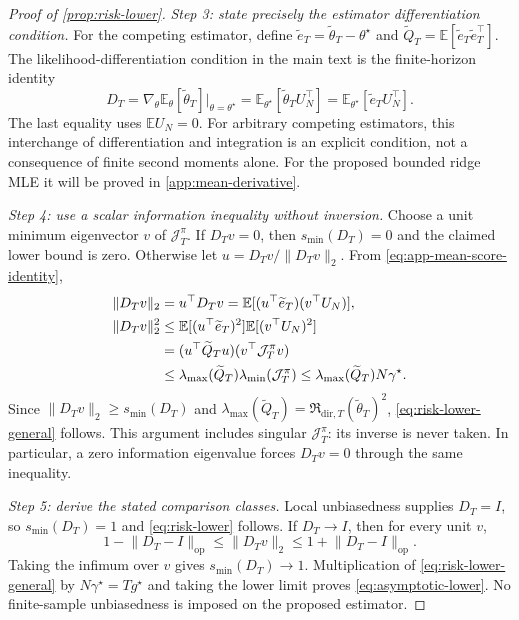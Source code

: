 \documentclass[10pt,twoside,letterpaper]{article}
\newcommand{\E}{\mathbb E}
\newcommand{\op}{\mathrm{op}}
\newcommand{\norm}[1]{\lVert #1\rVert}
\newcommand{\gstar}{g^\star}
\begin{document}
\begin{proof}[Proof of \cref{prop:risk-lower}]
\textit{Step 3: state precisely the estimator differentiation condition.}
For the competing estimator, define
$\widetilde e_T=\widetilde\theta_T-\theta^\star$ and
$\widetilde Q_T=\E[\widetilde e_T\widetilde e_T^\top]$.
The likelihood-differentiation condition in the main text is the
finite-horizon identity
\begin{equation}
D_T=\nabla_\theta\E_\theta[\widetilde\theta_T]\big|_{\theta=\theta^\star}
=\E_{\theta^\star}[\widetilde\theta_TU_N^\top]
=\E_{\theta^\star}[\widetilde e_TU_N^\top].
\label{eq:app-mean-score-identity}
\end{equation}
The last equality uses $\E U_N=0$. For arbitrary competing estimators,
this interchange of differentiation and integration is an explicit
condition, not a consequence of finite second moments alone.
For the proposed bounded ridge MLE it will be proved in
\cref{app:mean-derivative}.

\textit{Step 4: use a scalar information inequality without inversion.}
Choose a unit minimum eigenvector $v$ of $\mathcal J_T^\pi$.
If $D_Tv=0$, then $s_{\min}(D_T)=0$ and the claimed lower bound is
zero. Otherwise let $u=D_Tv/\norm{D_Tv}_2$. From
\eqref{eq:app-mean-score-identity},
\begin{align}
\norm{D_Tv}_2
&=u^\top D_Tv
=\E[(u^\top\widetilde e_T)(v^\top U_N)],\notag\\
\norm{D_Tv}_2^2
&\le\E[(u^\top\widetilde e_T)^2]\E[(v^\top U_N)^2]\notag\\
&=(u^\top\widetilde Q_Tu)(v^\top\mathcal J_T^\pi v)\notag\\
&\le\lambda_{\max}(\widetilde Q_T)
\lambda_{\min}(\mathcal J_T^\pi)
\le\lambda_{\max}(\widetilde Q_T)N\gamma^\star.
\label{eq:app-cr-direction}
\end{align}
Since $\norm{D_Tv}_2\ge s_{\min}(D_T)$ and
$\lambda_{\max}(\widetilde Q_T)
=\mathfrak R_{\mathrm{dir},T}(\widetilde\theta_T)^2$,
\eqref{eq:risk-lower-general} follows. This argument includes singular
$\mathcal J_T^\pi$: its inverse is never taken. In particular, a zero
information eigenvalue forces $D_Tv=0$ through the same inequality.

\textit{Step 5: derive the stated comparison classes.}
Local unbiasedness supplies $D_T=I$, so $s_{\min}(D_T)=1$ and
\eqref{eq:risk-lower} follows. If $D_T\to I$, then for every unit $v$,
\begin{equation}
1-\norm{D_T-I}_{\op}\le\norm{D_Tv}_2
\le1+\norm{D_T-I}_{\op}.
\label{eq:app-smallest-singular-limit}
\end{equation}
Taking the infimum over $v$ gives $s_{\min}(D_T)\to1$. Multiplication
of \eqref{eq:risk-lower-general} by $N\gamma^\star=T\gstar$ and
taking the lower limit proves \eqref{eq:asymptotic-lower}.
No finite-sample unbiasedness is imposed on the proposed estimator.
\end{proof}
\end{document}
